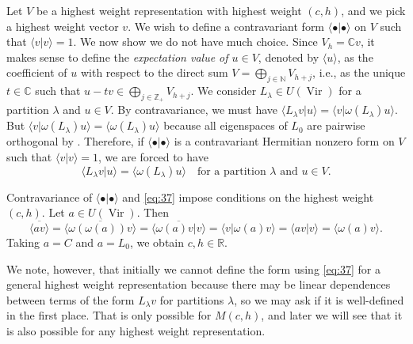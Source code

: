 \documentclass[a4paper, 12pt, reqno]{amsart}
\theoremstyle{remark}
\DeclareMathOperator{\Vir}{Vir}
\begin{document}
Let $V$ be a highest weight representation with highest weight $(c, h)$, and we pick a highest weight vector $v$.
We wish to define a contravariant form $\langle\bullet| \bullet\rangle$ on $V$ such that $\langle v| v\rangle = 1$.
We now show we do not have much choice.
Since $V_h = \mathbb{C}v$, it makes sense to define the \emph{expectation value of $u \in V$}, denoted by $\langle u\rangle$, as the coefficient of $u$ with respect to the direct sum $V = \bigoplus_{j \in \mathbb{N}}V_{h + j}$, i.e., as the unique $t \in \mathbb{C}$ such that $u - tv \in \bigoplus_{j \in \mathbb{Z}_+}V_{h + j}$.
We consider $L_{\lambda} \in U(\Vir)$ for a partition $\lambda$ and $u \in V$.
By contravariance, we must have $\langle L_{\lambda}v| u\rangle = \langle v| \omega(L_{\lambda})u\rangle$.
But $\langle v| \omega(L_{\lambda})u\rangle = \langle\omega(L_{\lambda})u\rangle$ because all eigenspaces of $L_0$ are pairwise orthogonal by .
Therefore, if $\langle\bullet| \bullet\rangle$ is a contravariant Hermitian nonzero form on $V$ such that $\langle v| v\rangle = 1$, we are forced to have
\begin{equation}
  \label{eq:37}
  \langle L_{\lambda}v| u\rangle = \langle\omega(L_{\lambda})u\rangle \quad \text{for a partition $\lambda$ and $u \in V$}.
\end{equation}

Contravariance of $\langle\bullet| \bullet\rangle$ and \eqref{eq:37} impose conditions on the highest weight $(c, h)$.
Let $a \in U(\Vir)$.
Then
\begin{equation*}
  \overline{\langle av\rangle} = \overline{\langle\omega(\omega(a))v\rangle} = \overline{\langle\omega(a)v| v\rangle} = \langle v| \omega(a)v\rangle = \langle av| v\rangle = \langle\omega(a)v\rangle.
\end{equation*}
Taking $a = C$ and $a = L_0$, we obtain $c, h \in \mathbb{R}$.

We note, however, that initially we cannot define the form using \eqref{eq:37} for a general highest weight representation because there may be linear dependences between terms of the form $L_{\lambda}v$ for partitions $\lambda$, so we may ask if it is well-defined in the first place.
That is only possible for $M(c, h)$, and later we will see that it is also possible for any highest weight representation.
\end{document}
